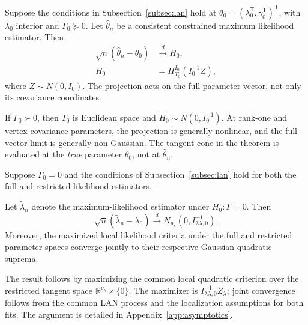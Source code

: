 \begin{theorem}\label{thm:sec4-full-mle}
Suppose the conditions in Subsection~\ref{subsec:lan} hold at $\theta_0=(\lambda_0^{\mathsf T},\gamma_0^{\mathsf T})^{\mathsf T}$, with $\lambda_0$ interior and $\Gamma_0\succeq0$. Let $\widehat\theta_n$ be a consistent constrained maximum likelihood estimator. Then
\begin{equation}\label{eq:sec4-full-mle-limit}
\begin{aligned}
\sqrt n(\widehat\theta_n-\theta_0)
&\xrightarrow{d}H_0,\\
H_0&=\Pi_{T_0}^{I_0}(I_0^{-1}Z),
\end{aligned}
\end{equation}
where $Z\sim N(0,I_0)$. The projection acts on the full parameter vector, not only its covariance coordinates.
\end{theorem}
If $\Gamma_0\succ0$, then $T_0$ is Euclidean space and $H_0\sim N(0,I_0^{-1})$. At rank-one and vertex covariance parameters, the projection is generally nonlinear, and the full-vector limit is generally non-Gaussian. The tangent cone in the theorem is evaluated at the \emph{true} parameter $\theta_0$, not at $\widehat\theta_n$.


\begin{corollary}
\label{cor:sec4-restricted-null}
Suppose $\Gamma_0=0$ and the conditions of
Subsection~\ref{subsec:lan} hold for both
the full and restricted likelihood estimators.

Let $\widetilde\lambda_n$ denote the
maximum-likelihood estimator under
$H_0:\Gamma=0$. Then
\begin{equation}
\label{eq:sec4-restricted-null-limit}
\sqrt n(\widetilde\lambda_n-\lambda_0)
\xrightarrow{d}
N_{p_\lambda}
\left(0,I_{\lambda\lambda,0}^{-1}\right).
\end{equation}
Moreover, the maximized local likelihood
criteria under the full and restricted
parameter spaces converge jointly to
their respective Gaussian quadratic
suprema.
\end{corollary}

The result follows by maximizing the common local
quadratic criterion over the restricted tangent space
$\mathbb R^{p_\lambda}\times\{0\}$.
The maximizer is $I_{\lambda\lambda,0}^{-1}Z_\lambda$;
joint convergence follows from the common LAN process
and the localization assumptions for both fits.
The argument is detailed in Appendix~\ref{app:asymptotics}.


